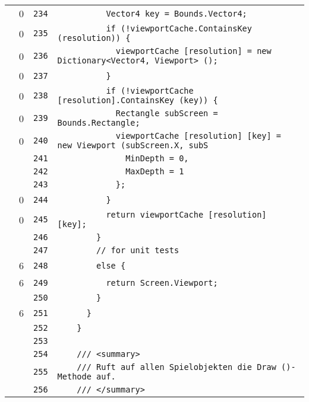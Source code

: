\documentclass[a4paper,10pt]{article}
\begin{document}
\begin{longtable}[l]{lrrl}
\cellcolor{red} & 0 & \verb~234~ & \verb~          Vector4 key = Bounds.Vector4;~\\
\cellcolor{red} & 0 & \verb~235~ & \verb~          if (!viewportCache.ContainsKey (resolution)) {~\\
\cellcolor{red} & 0 & \verb~236~ & \verb~            viewportCache [resolution] = new Dictionary<Vector4, Viewport> ();~\\
\cellcolor{red} & 0 & \verb~237~ & \verb~          }~\\
\cellcolor{red} & 0 & \verb~238~ & \verb~          if (!viewportCache [resolution].ContainsKey (key)) {~\\
\cellcolor{red} & 0 & \verb~239~ & \verb~            Rectangle subScreen = Bounds.Rectangle;~\\
\cellcolor{red} & 0 & \verb~240~ & \verb~            viewportCache [resolution] [key] = new Viewport (subScreen.X, subS~\\
\cellcolor{gray} &  & \verb~241~ & \verb~              MinDepth = 0,~\\
\cellcolor{gray} &  & \verb~242~ & \verb~              MaxDepth = 1~\\
\cellcolor{gray} &  & \verb~243~ & \verb~            };~\\
\cellcolor{red} & 0 & \verb~244~ & \verb~          }~\\
\cellcolor{red} & 0 & \verb~245~ & \verb~          return viewportCache [resolution] [key];~\\
\cellcolor{gray} &  & \verb~246~ & \verb~        }~\\
\cellcolor{gray} &  & \verb~247~ & \verb~        // for unit tests~\\
\cellcolor{green} & 6 & \verb~248~ & \verb~        else {~\\
\cellcolor{green} & 6 & \verb~249~ & \verb~          return Screen.Viewport;~\\
\cellcolor{gray} &  & \verb~250~ & \verb~        }~\\
\cellcolor{green} & 6 & \verb~251~ & \verb~      }~\\
\cellcolor{gray} &  & \verb~252~ & \verb~    }~\\
\cellcolor{gray} &  & \verb~253~ & \verb~~\\
\cellcolor{gray} &  & \verb~254~ & \verb~    /// <summary>~\\
\cellcolor{gray} &  & \verb~255~ & \verb~    /// Ruft auf allen Spielobjekten die Draw ()-Methode auf.~\\
\cellcolor{gray} &  & \verb~256~ & \verb~    /// </summary>~\\

\end{longtable}
\end{document}
